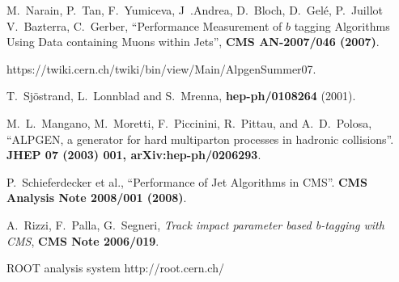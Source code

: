 \begin{thebibliography}{99}

M.~Narain, P.~Tan, F.~Yumiceva, J~.Andrea, D.~Bloch, D.~Gel\'e, P.~Juillot
V.~Bazterra, C.~Gerber, ``Performance Measurement of $b$ tagging Algorithms Using Data containing Muons within Jets'', 
{\bf CMS AN-2007/046 (2007)}.

https://twiki.cern.ch/twiki/bin/view/Main/AlpgenSummer07.

T.~Sj{\"o}strand, L.~Lonnblad and S.~Mrenna, 
{\bf hep-ph/0108264} (2001).

M.~L.~Mangano, M.~Moretti, F.~Piccinini, R.~Pittau, and A.~D.~Polosa, ``ALPGEN, a generator for hard multiparton processes in hadronic collisions''. 
{\bf JHEP 07 (2003) 001, arXiv:hep-ph/0206293}.

P.~Schieferdecker et al., ``Performance of Jet Algorithms in CMS''. 
{\bf CMS Analysis Note 2008/001 (2008)}.

    A.~Rizzi, F.~Palla, G.~Segneri,
    {\em Track impact parameter based b-tagging with CMS}, 
    {\bf CMS Note 2006/019}. 
 
ROOT analysis system 
http://root.cern.ch/

\end{thebibliography}
 
 


